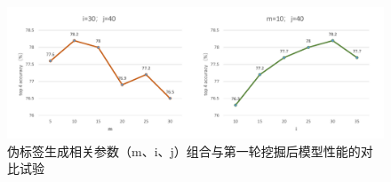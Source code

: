\begin{figure}[h]
  \centering
  \includegraphics[width=1.0\linewidth]{Img/mij.pdf}
  \caption{伪标签生成相关参数（m、i、j）组合与第一轮挖掘后模型性能的对比试验}
  \label{fig:mij}
\end{figure}
